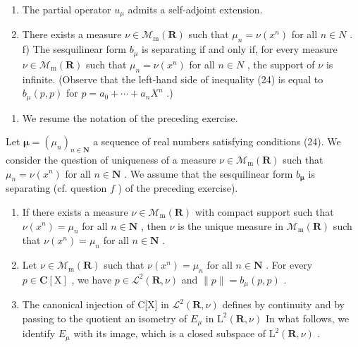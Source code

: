 \begin{enumerate}
\def\labelenumi{\alph{enumi})}
\setcounter{enumi}{3}
\item
  The partial operator \(u_{\mu}\) admits a self-adjoint extension.
\item
  There exists a measure \(\nu\in\mathcal{M}_{\mathrm{m}}(\mathbf{R})\) such that \(\mu_{n}=\nu(x^{n})\) for all \(n\in N\) . f) The sesquilinear form \(b_{\mu}\) is separating if and only if, for every measure \(\nu\in\mathcal{M}_{\mathrm{m}}(\mathbf{R})\) such that \(\mu_{n}=\nu(x^{n})\) for all \(n\in N\) , the support of \(\nu\) is infinite. (Observe that the left-hand side of inequality (24) is equal to \(b_{\mu}(p,p)\) for \(p=a_{0}+\cdots+a_{n}X^{n}\) .)
\end{enumerate}

\begin{enumerate}
\def\labelenumi{\arabic{enumi})}
\setcounter{enumi}{21}
\tightlist
\item
  We resume the notation of the preceding exercise.
\end{enumerate}

Let \(\boldsymbol{\mu} = (\mu_n)_{n\in \mathbf{N}}\) a sequence of real numbers satisfying conditions (24). We consider the question of uniqueness of a measure \(\nu \in \mathcal{M}_{\mathrm{m}}(\mathbf{R})\) such that \(\mu_{n} = \nu (x^{n})\) for all \(n\in \mathbf{N}\) . We assume that the sesquilinear form \(b_{\boldsymbol{\mu}}\) is separating (cf. question \(f\) ) of the preceding exercise).

\begin{enumerate}
\def\labelenumi{\alph{enumi})}
\item
  If there exists a measure \(\nu \in \mathcal{M}_{\mathrm{m}}(\mathbf{R})\) with compact support such that \(\nu(x^{n}) = \mu_{n}\) for all \(n \in \mathbf{N}\) , then \(\nu\) is the unique measure in \(\mathcal{M}_{\mathrm{m}}(\mathbf{R})\) such that \(\nu(x^{n}) = \mu_{n}\) for all \(n \in \mathbf{N}\) .
\item
  Let \(\nu \in \mathcal{M}_{\mathrm{m}}(\mathbf{R})\) such that \(\nu (x^n) = \mu_n\) for all \(n\in \mathbf{N}\) . For every \(p\in \mathbf{C}[\mathrm{X}]\) , we have \(p\in \mathcal{L}^2 (\mathbf{R},\nu)\) and \(\| p\| = b_{\mu}(p,p)\) .
\item
  The canonical injection of C{[}X{]} in \(\mathcal{L}^{2}(\mathbf{R},\nu)\) defines by continuity and by passing to the quotient an isometry of \(E_{\mu}\) in \(\mathrm{L}^{2}(\mathbf{R},\nu)\) In what follows, we identify \(E_{\mu}\) with its image, which is a closed subspace of \(\mathrm{L}^{2}(\mathbf{R},\nu)\) .
\end{enumerate}

